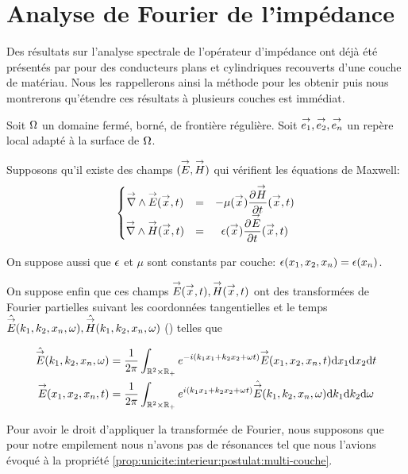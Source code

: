 \section{Analyse de Fourier de l'impédance}

Des résultats sur l'analyse spectrale de l'opérateur d'impédance ont déjà été présentés par \cite{hoppe_impedance_1995} pour des conducteurs plans et cylindriques recouverts d'une couche de matériau.
Nous les rappellerons ainsi la méthode pour les obtenir puis nous montrerons qu’étendre ces résultats à plusieurs couches est immédiat. 

Soit \(\OO\) un domaine fermé, borné, de frontière régulière. Soit \(\vect{e_1},\vect{e_2},\vect{e_n}\) un repère local adapté à la surface de \(\OO\).

Supposons qu'il existe des champs \((\vE,\vect H)\) qui vérifient les équations de Maxwell:
\begin{equation*}
    \left\lbrace
    \begin{matrix}
    \vrot \vE(\vect{x},t) &=& -\mu(\vx) \ddr{t}{\vect H}(\vx,t) \\
    \vrot \vect H(\vect{x},t) &=& \eps(\vx) \ddr{t}{\vE}(\vx,t)
    \end{matrix}
    \right.
\end{equation*}

On suppose aussi que \(\eps\) et \(\mu\) sont constants par couche: \(\eps(x_1,x_2,x_n)=\eps(x_n)\).

On suppose enfin que ces champs \(\vE(\vect{x},t),\vect H(\vect{x},t)\) ont des transformées de Fourier partielles suivant les coordonnées tangentielles et le temps \(\hat{\vE}(k_1,k_2,x_n,\w), \hat{\vect H}(k_1,k_2,x_n,\w)\) (\cite[Théorème de Plancherel, p.~153]{yosida_functional_1995}) telles que

\begin{align*}
    \hat{\vE} (k_1,k_2,x_n,\w) &= \frac{1}{2\pi}\int_{\RR^2\times\RR_+} e^{-i(k_1x_1+k_2x_2+\w t)}\vE(x_1,x_2,x_n,t) \dd{x_1}\dd{x_2}\dd{t}
    \\
    \vE(x_1,x_2,x_n,t) &= \frac{1}{2\pi}\int_{\RR^2\times\RR_+} e^{i(k_1x_1+k_2x_2+\w t)}\hat{\vE} (k_1,k_2,x_n,\w) \dd{k_1}\dd{k_2} \dd{\w}
\end{align*}

Pour avoir le droit d'appliquer la transformée de Fourier, nous supposons que pour notre empilement nous n'avons pas de résonances tel que nous l'avions évoqué à la propriété \eqref{prop:unicite:interieur:postulat:multi-couche}. 

